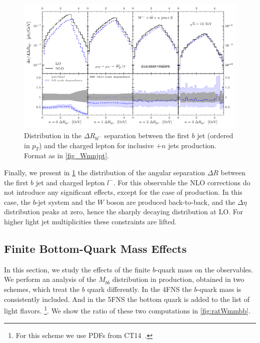 \begin{figure}[ht]
  \centering
  \includegraphics[clip,scale=1.0]{plots/drbl.pdf}
  \caption{Distribution in the $\Delta R_{bl^-}$ separation between the first
  $b$ jet (ordered in $p_T$) and the charged lepton for inclusive \Wbbm$+n$ jets
  production.  Format as in \cref{fig_Wmnjpt}.}
  \label{fig_Wmnjdrbl}
\end{figure}

Finally, we present in \cref{fig_Wmnjdrbl} the distribution of the angular separation  $\Delta R$ between the first $b$ jet and charged lepton $l^-$.
For this observable the NLO corrections do not introduce any significant effects, except for the case of \Wbb{} production.
In this case, the $b$-jet system and the $W$ boson are produced back-to-back, and the $\Delta \eta$ distribution peaks at zero,
hence the sharply decaying distribution at LO.
For higher light jet multiplicities these constraints are lifted.


\subsection{Finite Bottom-Quark Mass Effects}
\label{sec:bmass}


In this section, we study the effects of the finite $b$-quark mass on the observables.
We perform an analysis of the $M_{b\bar{b}}$ distribution in \Wbbnj[1]{} production,
obtained in two schemes, which treat the $b$ quark differently. 
In the 4FNS the $b$-quark mass is consistently included. 
And in the 5FNS the bottom quark is added to the list of light flavors.%
\footnote{For this scheme we use PDFs from CT14~\cite{CT14}.}.
We show the ratio of these two computations in \cref{fig:ratWmmbb}.


